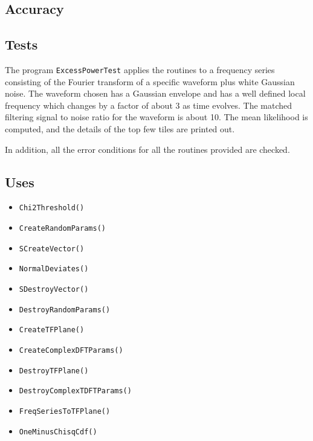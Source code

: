 \documentclass{article}
\begin{document}

\subsection{Accuracy}



\subsection{Tests}


The program \verb+ExcessPowerTest+ applies the routines to a frequency
series consisting of the Fourier transform of a specific waveform plus
white Gaussian noise.  The waveform chosen has a Gaussian envelope and
has a well defined local frequency which changes by a factor of about
3 as time evolves.  The matched filtering signal to noise ratio for
the waveform is about 10.  The mean likelihood is computed, and the
details of the top few tiles are printed out.  

In addition, all the error conditions for all the routines provided
are checked.


\subsection{Uses}


\begin{itemize}
\item\texttt{Chi2Threshold()}
\item\texttt{CreateRandomParams()}
\item\texttt{SCreateVector()}
\item\texttt{NormalDeviates()}
\item\texttt{SDestroyVector()}
\item\texttt{DestroyRandomParams()}
\item\texttt{CreateTFPlane()}
\item\texttt{CreateComplexDFTParams()}
\item\texttt{DestroyTFPlane()}
\item\texttt{DestroyComplexTDFTParams()}
\item\texttt{FreqSeriesToTFPlane()}
\item\texttt{OneMinusChisqCdf()}
\end{itemize}
\end{document}
